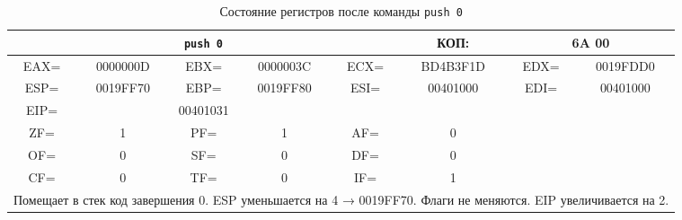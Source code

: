 \begin{table}[H]
    \centering
    \caption{Состояние регистров после команды \texttt{push 0}}
    \label{tab:after_push_0}
    \small
    \renewcommand{\arraystretch}{1.3}
    \begin{tabular}{|c|c|c|c|c|c|c|c|}
    \hline
    \multicolumn{5}{|c|}{\cellcolor{green!40}\textbf{\texttt{push 0}}} & \cellcolor{green!20} КОП: & \multicolumn{2}{c|}{\cellcolor{green!20} 6A 00} \\
    \hline
    \cellcolor{blue!30} EAX= & 0000000D & \cellcolor{blue!30} EBX= & 0000003C & \cellcolor{blue!30} ECX= & BD4B3F1D & \cellcolor{blue!30} EDX= & 0019FDD0 \\
    \hline
    \cellcolor{blue!30} ESP= & \cellcolor{red!70} 0019FF70 & \cellcolor{blue!30} EBP= & 0019FF80 & \cellcolor{blue!30} ESI= & 00401000 & \cellcolor{blue!30} EDI= & 00401000 \\
    \hline
    \cellcolor{blue!30} EIP= & \multicolumn{3}{c|}{\cellcolor{red!70} 00401031} & \multicolumn{4}{c|}{} \\
    \hline
    \cellcolor{pink} ZF= & 1 & \cellcolor{pink} PF= & 1 & \cellcolor{pink} AF= & 0 & \multicolumn{2}{c|}{\cellcolor{gray!50}} \\
    \cline{1-6}
    \cellcolor{pink} OF= & 0 & \cellcolor{pink} SF= & 0 & \cellcolor{pink} DF= & 0 & \multicolumn{2}{c|}{\cellcolor{gray!50}} \\
    \cline{1-6}
    \cellcolor{pink} CF= & 0 & \cellcolor{pink} TF= & 0 & \cellcolor{pink} IF= & 1 & \multicolumn{2}{c|}{\cellcolor{gray!50}} \\
    \hline
    \multicolumn{8}{|p{14cm}|}{Помещает в стек код завершения 0. ESP уменьшается на 4 → 0019FF70. Флаги не меняются. EIP увеличивается на 2.} \\
    \hline
    \end{tabular}
\end{table}